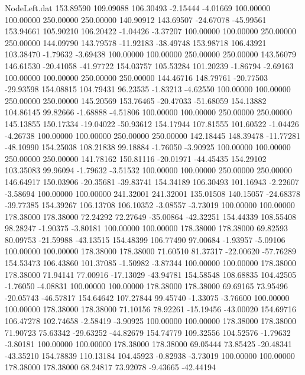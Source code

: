 \begin{filecontents}{NodeLeft.dat}
 153.89590  109.09088  106.30493    -2.15444   -4.01669  100.00000  100.00000  250.00000  250.00000  140.90912  143.69507  -24.67078  -45.99561
 153.94661  105.90210  106.20422    -1.04426   -3.37207  100.00000  100.00000  250.00000  250.00000  144.09790  143.79578  -11.92183  -38.49748
 153.98718  106.43921  103.38470    -1.79632   -3.69438  100.00000  100.00000  250.00000  250.00000  143.56079  146.61530  -20.41058  -41.97722
 154.03757  105.53284  101.20239    -1.86794   -2.69163  100.00000  100.00000  250.00000  250.00000  144.46716  148.79761  -20.77503  -29.93598
 154.08815  104.79431   96.23535    -1.83213   -4.62550  100.00000  100.00000  250.00000  250.00000  145.20569  153.76465  -20.47033  -51.68059
 154.13882  104.86145   99.82666    -1.68888   -4.51806  100.00000  100.00000  250.00000  250.00000  145.13855  150.17334  -19.04022  -50.93612
 154.17944  107.81555  101.60522    -1.04426   -4.26738  100.00000  100.00000  250.00000  250.00000  142.18445  148.39478  -11.77281  -48.10990
 154.25038  108.21838   99.18884    -1.76050   -3.90925  100.00000  100.00000  250.00000  250.00000  141.78162  150.81116  -20.01971  -44.45435
 154.29102  103.35083   99.96094    -1.79632   -3.51532  100.00000  100.00000  250.00000  250.00000  146.64917  150.03906  -20.35681  -39.83741
 154.34189  106.30493  101.16943    -2.22607   -3.58694  100.00000  100.00000  241.32001  241.32001  135.01508  140.15057  -24.68378  -39.77385
 154.39267  106.13708  106.10352    -3.08557   -3.73019  100.00000  100.00000  178.38000  178.38000   72.24292   72.27649  -35.00864  -42.32251
 154.44339  108.55408   98.28247    -1.90375   -3.80181  100.00000  100.00000  178.38000  178.38000   69.82593   80.09753  -21.59988  -43.13515
 154.48399  106.77490   97.00684    -1.93957   -5.09106  100.00000  100.00000  178.38000  178.38000   71.60510   81.37317  -22.00620  -57.76289
 154.53473  106.43860  101.37085    -1.50982   -3.87344  100.00000  100.00000  178.38000  178.38000   71.94141   77.00916  -17.13029  -43.94781
 154.58548  108.68835  104.42505    -1.76050   -4.08831  100.00000  100.00000  178.38000  178.38000   69.69165   73.95496  -20.05743  -46.57817
 154.64642  107.27844   99.45740    -1.33075   -3.76600  100.00000  100.00000  178.38000  178.38000   71.10156   78.92261  -15.19456  -43.00020
 154.69716  106.47278  102.74658    -2.58419   -3.90925  100.00000  100.00000  178.38000  178.38000   71.90723   75.63342  -29.63252  -44.82679
 154.74779  109.32556  104.52576    -1.79632   -3.80181  100.00000  100.00000  178.38000  178.38000   69.05444   73.85425  -20.48341  -43.35210
 154.78839  110.13184  104.45923    -0.82938   -3.73019  100.00000  100.00000  178.38000  178.38000   68.24817   73.92078   -9.43665  -42.44194

\end{filecontents}
